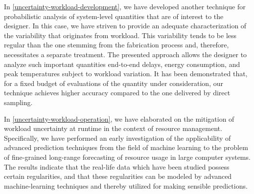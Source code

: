 In \cref{uncertainty-workload-development}, we have developed another technique
for probabilistic analysis of system-level quantities that are of interest to
the designer. In this case, we have striven to provide an adequate
characterization of the variability that originates from workload. This
variability tends to be less regular than the one stemming from the fabrication
process and, therefore, necessitates a separate treatment. The presented
approach allows the designer to analyze such important quantities end-to-end
delays, energy consumption, and peak temperatures subject to workload variation.
It has been demonstrated that, for a fixed budget of evaluations of the quantity
under consideration, our technique achieves higher accuracy compared to the one
delivered by direct sampling.

In \cref{uncertainty-workload-operation}, we have elaborated on the mitigation
of workload uncertainty at runtime in the context of resource management.
Specifically, we have performed an early investigation of the applicability of
advanced prediction techniques from the field of machine learning to the problem
of fine-grained long-range forecasting of resource usage in large computer
systems. The results indicate that the real-life data which have been studied
possess certain regularities, and that these regularities can be modeled by
advanced machine-learning techniques and thereby utilized for making sensible
predictions.

